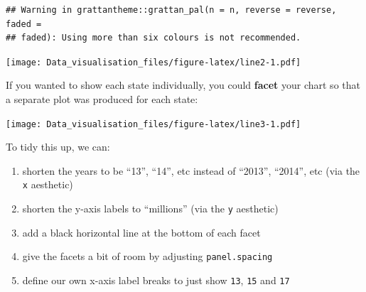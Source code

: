 \documentclass[]{book}
\newenvironment{Shaded}{\begin{snugshade}}{\end{snugshade}}
\newcommand{\DataTypeTok}[1]{\textcolor[rgb]{0.13,0.29,0.53}{#1}}
\newcommand{\DecValTok}[1]{\textcolor[rgb]{0.00,0.00,0.81}{#1}}
\newcommand{\KeywordTok}[1]{\textcolor[rgb]{0.13,0.29,0.53}{\textbf{#1}}}
\newcommand{\NormalTok}[1]{#1}
\newcommand{\OperatorTok}[1]{\textcolor[rgb]{0.81,0.36,0.00}{\textbf{#1}}}
\newcommand{\StringTok}[1]{\textcolor[rgb]{0.31,0.60,0.02}{#1}}
\providecommand{\tightlist}{%
  \setlength{\itemsep}{0pt}\setlength{\parskip}{0pt}}
\begin{document}
\begin{verbatim}
## Warning in grattantheme::grattan_pal(n = n, reverse = reverse, faded =
## faded): Using more than six colours is not recommended.
\end{verbatim}

\texttt{[image: Data\_visualisation\_files/figure-latex/line2-1.pdf]}

If you wanted to show each state individually, you could \textbf{facet} your chart so that a separate plot was produced for each state:

\begin{Shaded}
\end{Shaded}

\texttt{[image: Data\_visualisation\_files/figure-latex/line3-1.pdf]}

To tidy this up, we can:

\begin{enumerate}
\def\labelenumi{\arabic{enumi}.}
\tightlist
\item
  shorten the years to be ``13'', ``14'', etc instead of ``2013'', ``2014'', etc (via the \texttt{x} aesthetic)
\item
  shorten the y-axis labels to ``millions'' (via the \texttt{y} aesthetic)
\item
  add a black horizontal line at the bottom of each facet
\item
  give the facets a bit of room by adjusting \texttt{panel.spacing}
\item
  define our own x-axis label breaks to just show \texttt{13}, \texttt{15} and \texttt{17}
\end{enumerate}
\end{document}
